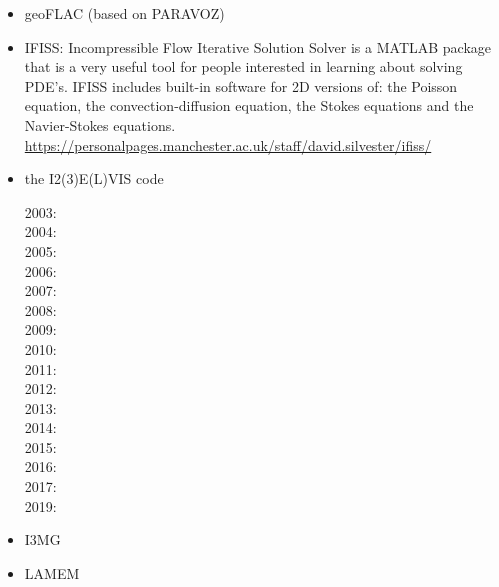 \begin{itemize}
\item geoFLAC (based on PARAVOZ)
\cite{jala19}

\item IFISS: Incompressible Flow Iterative Solution Solver is a
MATLAB package that is a very useful tool for people interested in
learning about solving PDE’s.
IFISS includes built-in software for 2D versions of:
the Poisson equation, the convection-diffusion equation, the Stokes equations
and the Navier-Stokes equations.\\
\url{https://personalpages.manchester.ac.uk/staff/david.silvester/ifiss/}



\item the I2(3)E(L)VIS code

2003: \cite{geyu03}\cite{geyu03b}\cite{geur03}\\
2004: \cite{geym04}\cite{geys04}\cite{gepm04}\\
2005: \cite{buge05}\\
2006: \cite{bbeg06}\cite{gest06}\cite{gogc06}\cite{gecy06}\\
2007: \cite{geyu07}\cite{gogc07}\\
2008: \cite{scbe08}\cite{gecy08}\cite{uegs08}\cite{fagc08}\cite{zhgy09}\\
2009: \cite{gefc09}\\
2010: \cite{gerya2010}\cite{nigm10}\\
2011: \cite{dugm11}\cite{dumg11}\cite{lixg11}\cite{gery11}\cite{geme11}\\
2012: \cite{crsg12}\cite{dugk12}\cite{lixg12}\cite{fagm12}\\
2013: \cite{lixg13}\cite{nabg13}\cite{magc13}\cite{vagd13a}\cite{vagd13b}\cite{zhgt13}\cite{dyge13}\cite{gemd13}\cite{mana13}\\
2014: \cite{dugs14}\cite{puge14}\cite{rugb14}\cite{voge14b}\cite{bagb14}\cite{lige14}\cite{stjm14}\cite{malg14}
\cite{buge14}\cite{gosk14}\cite{bagb14}\cite{vamd14}\\
2015: \cite{duay15}\cite{uewg15}\cite{rula15}\cite{gesb15}\cite{rula15}\\
2016: \cite{kobc16}\cite{magc16}\cite{fige16}\cite{mauw16}\\
2017: \cite{mauw17}\\
2019: \cite{kobg19}\cite{ligc19}

\item I3MG
\cite{facc14}

\item LAMEM
\cite{scbe08}
\cite{kamm10}
\cite{lemk11}
\cite{may12}
\cite{lesh14}
\cite{cokm14}
\cite{bakp14}
\cite{feka14a}
\cite{feka14b}
\cite{puka15}
\cite{feka15}
\cite{cofk15}
\cite{kapb16}


\end{itemize}
